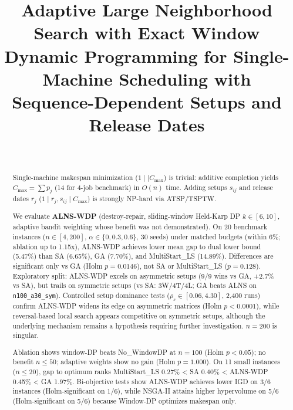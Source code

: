 \documentclass[journal]{IEEEtran}
\begin{document}
\title{Adaptive Large Neighborhood Search with Exact Window Dynamic Programming for Single-Machine Scheduling with Sequence-Dependent Setups and Release Dates}

\author{
    \\
}

\maketitle

\begin{abstract}
Single-machine makespan minimization ($1 \mid\mid C_{\max}$) is trivial: additive completion yields $C_{\max} = \sum p_j$ (14 for 4-job benchmark) in $O(n)$ time. Adding setups $s_{ij}$ and release dates $r_j$ ($1 \mid r_j, s_{ij} \mid C_{\max}$) is strongly NP-hard via ATSP/TSPTW.

We evaluate \textbf{ALNS-WDP} (destroy-repair, sliding-window Held-Karp DP $k \in [6, 10]$, adaptive bandit weighting whose benefit was not demonstrated). On 20 benchmark instances ($n \in [4, 200]$, $\alpha \in \{0, 0.3, 0.6\}$, 30 seeds) under matched budgets (within 6\%; ablation up to 1.15x), ALNS-WDP achieves lower mean gap to dual lower bound (5.47\%) than SA (6.65\%), GA (7.70\%), and MultiStart\_LS (14.89\%). Differences are significant only vs GA (Holm $p=0.0146$), not SA or MultiStart\_LS ($p=0.128$). Exploratory split: ALNS-WDP excels on asymmetric setups (9/9 wins vs GA, +2.7\% vs SA), but trails on symmetric setups (vs SA: 3W/4T/4L; GA beats ALNS on \texttt{n100\_a30\_sym}). Controlled setup dominance tests ($\rho_s \in [0.06, 4.30]$, 2,400 runs) confirm ALNS-WDP widens its edge on asymmetric matrices (Holm $p < 0.0001$), while reversal-based local search appears competitive on symmetric setups, although the underlying mechanism remains a hypothesis requiring further investigation. $n=200$ is singular.

Ablation shows window-DP beats No\_WindowDP at $n=100$ (Holm $p < 0.05$); no benefit $n \le 50$; adaptive weights show no gain (Holm $p=1.000$). On 11 small instances ($n \le 20$), gap to optimum ranks MultiStart\_LS 0.27\% < SA 0.40\% < ALNS-WDP 0.45\% < GA 1.97\%. Bi-objective tests show ALNS-WDP achieves lower IGD on 3/6 instances (Holm-significant on 1/6), while NSGA-II attains higher hypervolume on 5/6 (Holm-significant on 5/6) because Window-DP optimizes makespan only.
\end{abstract}
\end{document}

